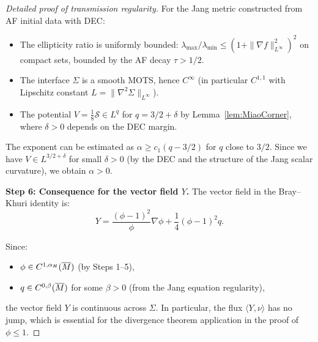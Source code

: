 \begin{proof}[Detailed proof of transmission regularity]
For the Jang metric constructed from AF initial data with DEC:
\begin{itemize}
    \item The ellipticity ratio is uniformly bounded: $\lambda_{\max}/\lambda_{\min} \le (1 + \|\nabla f\|_{L^\infty}^2)^2$ on compact sets, bounded by the AF decay $\tau > 1/2$.
    \item The interface $\Sigma$ is a smooth MOTS, hence $C^\infty$ (in particular $C^{1,1}$ with Lipschitz constant $L = \|\nabla^2 \Sigma\|_{L^\infty}$).
    \item The potential $V = \frac{1}{8}\mathcal{S} \in L^{q}$ for $q = 3/2 + \delta$ by Lemma~\ref{lem:MiaoCorner}, where $\delta > 0$ depends on the DEC margin.
\end{itemize}

The exponent can be estimated as $\alpha \ge c_1 (q - 3/2)$ for $q$ close to $3/2$. Since we have $V \in L^{3/2 + \delta}$ for small $\delta > 0$ (by the DEC and the structure of the Jang scalar curvature), we obtain $\alpha > 0$.

\textbf{Step 6: Consequence for the vector field $Y$.}
The vector field in the Bray--Khuri identity is:
\begin{equation}
    Y = \frac{(\phi - 1)^2}{\phi} \nabla \phi + \frac{1}{4} (\phi - 1)^2 q.
\end{equation}

Since:
\begin{itemize}
    \item $\phi \in C^{1,\alpha_H}(\overline{M})$ (by Steps 1--5),
    \item $q \in C^{0,\beta}(\overline{M})$ for some $\beta > 0$ (from the Jang equation regularity),
\end{itemize}
the vector field $Y$ is continuous across $\Sigma$. In particular, the flux $\langle Y, \nu \rangle$ has no jump, which is essential for the divergence theorem application in the proof of $\phi \le 1$.
\end{proof}

